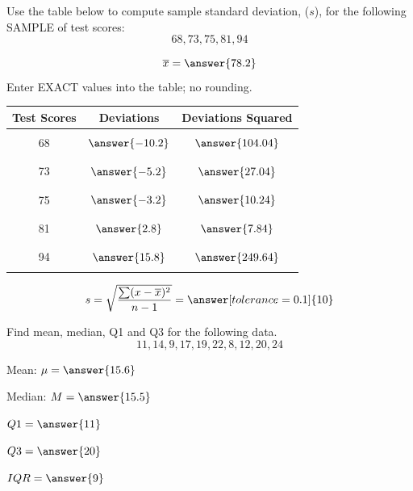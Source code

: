 \documentclass{ximera}
\begin{document}
\begin{problem}\label{prob:140finalprob6}
Use the table below to compute sample standard deviation, ($s$), for the following SAMPLE of test scores:
$$68, 73, 75, 81, 94$$

$$\overline{x}=\answer{78.2}$$
Enter EXACT values into the table; no rounding.
\begin{center}
\begin{tabular}{|c|c|c|}
Test Scores & Deviations & Deviations Squared  \\
 \hline
 \hline
   & &\\
 68 &$\answer{-10.2}$  & $\answer{104.04}$ \\
  & &\\
  \hline
   & &\\
 73 &$\answer{-5.2}$  & $\answer{27.04}$\\
  & &\\
 \hline
  & &\\
 75 &$\answer{-3.2}$ &$\answer{10.24}$ \\
  & &\\
 \hline
  & &\\
 81 &$\answer{2.8}$  &$\answer{7.84}$ \\
  & &\\
 \hline
  & &\\
 94 &$\answer{15.8}$  &$\answer{249.64}$ \\
  & &\\
 \hline
  
\end{tabular}
\end{center}
$$s =\sqrt{\frac{\sum (x-\overline{x})^2}{n-1}}=\answer[tolerance=0.1]{10}$$
\end{problem}

\begin{problem}\label{prob:140finalprob7}
Find mean, median, Q1 and Q3 for the following data. 
$$11, 14, 9, 17, 19, 22, 8, 12, 20, 24$$

Mean:  $\mu=\answer{15.6}$

Median:  $M=\answer{15.5}$

$Q1=\answer{11}$

$Q3=\answer{20}$

$IQR=\answer{9}$
\end{problem}
\end{document}
